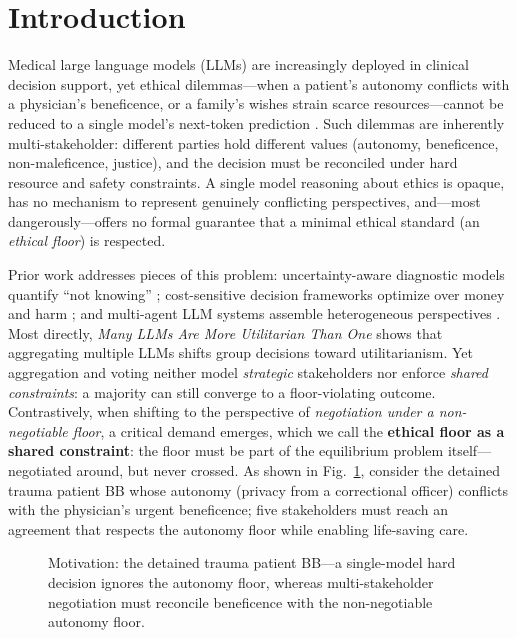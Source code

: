 \documentclass[11pt]{article}
\begin{document}
\section{Introduction}
Medical large language models (LLMs) are increasingly deployed in clinical
decision support, yet ethical dilemmas---when a patient's autonomy conflicts
with a physician's beneficence, or a family's wishes strain scarce
resources---cannot be reduced to a single model's next-token prediction
\cite{challenge2025,frontiers2026}. Such dilemmas are inherently
multi-stakeholder: different parties hold different values (autonomy,
beneficence, non-maleficence, justice), and the decision must be reconciled
under hard resource and safety constraints. A single model reasoning about
ethics is opaque, has no mechanism to represent genuinely conflicting
perspectives, and---most dangerously---offers no formal guarantee that a
minimal ethical standard (an \emph{ethical floor}) is respected.

Prior work addresses pieces of this problem: uncertainty-aware diagnostic
models quantify ``not knowing'' \cite{confidx,entropy2026}; cost-sensitive
decision frameworks optimize over money and harm \cite{graphdx}; and
multi-agent LLM systems assemble heterogeneous perspectives
\cite{aegle,emomas,kamac,graphofstates}. Most directly,
\emph{Many LLMs Are More Utilitarian Than One} \cite{utilitarian2025} shows
that aggregating multiple LLMs shifts group decisions toward utilitarianism.
Yet aggregation and voting neither model \emph{strategic} stakeholders nor
enforce \emph{shared constraints}: a majority can still converge to a
floor-violating outcome. Contrastively, when shifting to the perspective of
\emph{negotiation under a non-negotiable floor}, a critical demand emerges,
which we call the \textbf{ethical floor as a shared constraint}: the floor
must be part of the equilibrium problem itself---negotiated around, but never
crossed. As shown in Fig.~\ref{fig:motive}, consider the detained trauma
patient BB whose autonomy (privacy from a correctional officer) conflicts with
the physician's urgent beneficence; five stakeholders must reach an agreement
that respects the autonomy floor while enabling life-saving care.
\begin{figure}[t]
  \centering
  \caption{Motivation: the detained trauma patient BB---a single-model hard
  decision ignores the autonomy floor, whereas multi-stakeholder negotiation
  must reconcile beneficence with the non-negotiable autonomy floor.}
  \label{fig:motive}
\end{figure}
\end{document}
